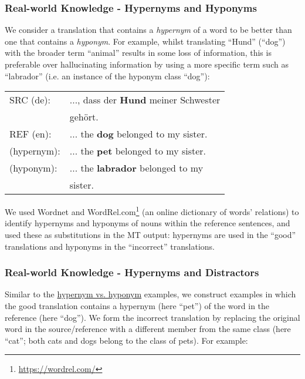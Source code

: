 \documentclass[11pt]{article}
\newcommand{\cmark}{\textcolor{darkpastelgreen}{\ding{51}}}\newcommand{\xmark}{\textcolor{darkpastelred}{\ding{55}}}
\begin{document}
\subsubsection{Real-world Knowledge - Hypernyms and Hyponyms}
\label{sec:hypernym-hyponym}

We consider a translation that contains a \textit{hypernym} of a word to be better than one that contains a \textit{hyponym}. For example, whilst translating ``Hund'' (``dog'') with the broader term ``animal'' results in some loss of information, this is preferable over hallucinating information by using a more specific term such as ``labrador'' (i.e. an instance of the hyponym class ``dog''):

\begin{small}
\vspace{0.5cm}
\setlength{\extrarowheight}{0.1cm}
\begin{tabular}{ll}
     SRC (de): & ..., dass der \textbf{Hund} meiner Schwester\\
     & gehört.\\
     REF (en): & ... the \textbf{dog} belonged to my sister.\\
     \cmark{} (hypernym): & ... the \textbf{pet} belonged to my sister.\\
     \xmark{} (hyponym): & ... the \textbf{labrador} belonged to my\\  &sister.
     \vspace{0.35cm}
\end{tabular}
\end{small}

We used Wordnet and WordRel.com\footnote{\url{https://wordrel.com/}} (an online dictionary of words’ relations) to identify hypernyms and hyponyms of nouns within the reference sentences, and used these as substitutions in the MT output: hypernyms are used in the ``good'' translations and hyponyms in the ``incorrect'' translations.


\subsubsection{Real-world Knowledge - Hypernyms and Distractors}
Similar to the \hyperref[sec:hypernym-hyponym]{hypernym vs. hyponym} examples, we construct examples in which the good translation contains a hypernym (here ``pet'') of the word in the reference (here ``dog''). We form the incorrect translation by replacing the original word in the source/reference with a different member from the same class (here ``cat''; both cats and dogs belong to the class of pets). For example:
\end{document}
